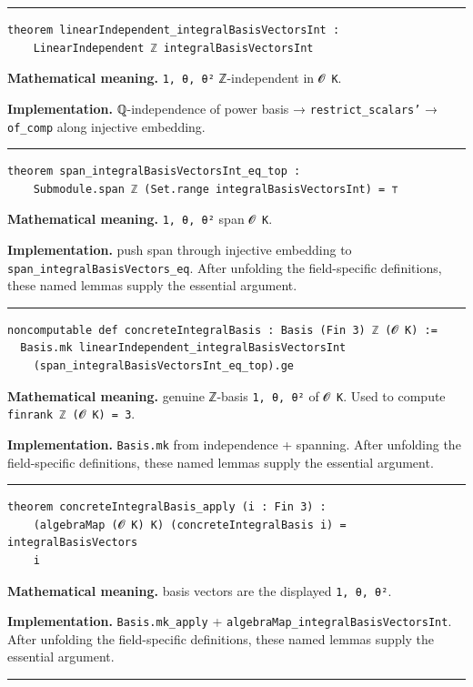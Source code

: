 \documentclass[UTF8,a4paper,11pt,fontset=fandol]{ctexart}
\theoremstyle{definition}
\newcommand{\statementsep}{\par\medskip\hrule\medskip}
\begin{document}
\statementsep
\begin{verbatim}
theorem linearIndependent_integralBasisVectorsInt :
    LinearIndependent ℤ integralBasisVectorsInt
\end{verbatim}
\noindent\textbf{Mathematical meaning.} \texttt{1, θ, θ²} ℤ-independent in \texttt{𝓞 K}.\par
\noindent\textbf{Implementation.} ℚ-independence of power basis → \texttt{restrict\_\allowbreak{}scalars'} → \texttt{of\_\allowbreak{}comp} along injective embedding.\par
\statementsep
\begin{verbatim}
theorem span_integralBasisVectorsInt_eq_top :
    Submodule.span ℤ (Set.range integralBasisVectorsInt) = ⊤
\end{verbatim}
\noindent\textbf{Mathematical meaning.} \texttt{1, θ, θ²} span \texttt{𝓞 K}.\par
\noindent\textbf{Implementation.} push span through injective embedding to \texttt{span\_\allowbreak{}integralBasisVectors\_\allowbreak{}eq}. After unfolding the field-specific definitions, these named lemmas supply the essential argument.\par
\statementsep
\begin{verbatim}
noncomputable def concreteIntegralBasis : Basis (Fin 3) ℤ (𝓞 K) :=
  Basis.mk linearIndependent_integralBasisVectorsInt
    (span_integralBasisVectorsInt_eq_top).ge
\end{verbatim}
\noindent\textbf{Mathematical meaning.} genuine ℤ-basis \texttt{1, θ, θ²} of \texttt{𝓞 K}. Used to compute \texttt{finrank ℤ (𝓞 K) = 3}.\par
\noindent\textbf{Implementation.} \texttt{Basis.\allowbreak{}mk} from independence + spanning. After unfolding the field-specific definitions, these named lemmas supply the essential argument.\par
\statementsep
\begin{verbatim}
theorem concreteIntegralBasis_apply (i : Fin 3) :
    (algebraMap (𝓞 K) K) (concreteIntegralBasis i) = integralBasisVectors
    i
\end{verbatim}
\noindent\textbf{Mathematical meaning.} basis vectors are the displayed \texttt{1, θ, θ²}.\par
\noindent\textbf{Implementation.} \texttt{Basis.\allowbreak{}mk\_\allowbreak{}apply} + \texttt{algebraMap\_\allowbreak{}integralBasisVectorsInt}. After unfolding the field-specific definitions, these named lemmas supply the essential argument.\par
\statementsep
\end{document}
